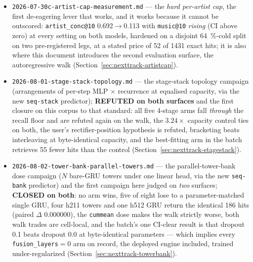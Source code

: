 \documentclass[11pt]{article}
\begin{document}
\begin{itemize}
  \item \texttt{2026-07-30c-artist-cap-measurement.md} --- the \emph{hard
    per-artist cap}, the first de-eagering lever that works, and it works because
    it cannot be outscored: \texttt{artist\_conc@10}
    \num{0.692}$\to$\num{0.113} with \texttt{music@10} \emph{rising} (CI above
    zero) at every setting on both models, hardened on a disjoint
    \SI{64}{\percent}-cold split on two pre-registered legs, at a stated price of
    \num{52} of \num{1431} exact hits; it is also where this document introduces
    the second evaluation surface, the autoregressive walk
    (Section~\ref{sec:nexttrack-artistcap}).
  \item \texttt{2026-08-01-stage-stack-topology.md} --- the stage-stack
    topology campaign (arrangements of per-step MLP $\times$ recurrence at
    equalised capacity, via the new \texttt{seq-stack} predictor);
    \textbf{REFUTED on both surfaces} and the first closure on this corpus to that
    standard: all five 4-stage arms fall \emph{through} the recall floor and are
    refuted again on the walk, the $\num{3.24}\times$ capacity control ties on
    both, the user's rectifier-position hypothesis is refuted, bracketing beats
    interleaving at byte-identical capacity, and the best-fitting arm in the batch
    retrieves \num{55} fewer hits than the control
    (Section~\ref{sec:nexttrack-stagestack}).
  \item \texttt{2026-08-02-tower-bank-parallel-towers.md} --- the
    parallel-tower-bank dose campaign ($N$ bare-GRU towers under one linear head,
    via the new \texttt{seq-bank} predictor) and the first campaign here judged on
    \emph{two} surfaces; \textbf{CLOSED on both}: no arm wins, five of eight lose
    to a parameter-matched single GRU, four h211 towers and one h512 GRU return the
    identical \num{186} hits (paired $\Delta$ \num{0.000000}), the
    \texttt{cummean} dose makes the walk strictly worse, both walk trades are
    cell-local, and the batch's one CI-clear result is that dropout \num{0.1}
    beats dropout \num{0.0} at byte-identical parameters --- which implies every
    \texttt{fusion\_layers}${}=0$ arm on record, the deployed engine included,
    trained under-regularized (Section~\ref{sec:nexttrack-towerbank}).
\end{itemize}
\end{document}
